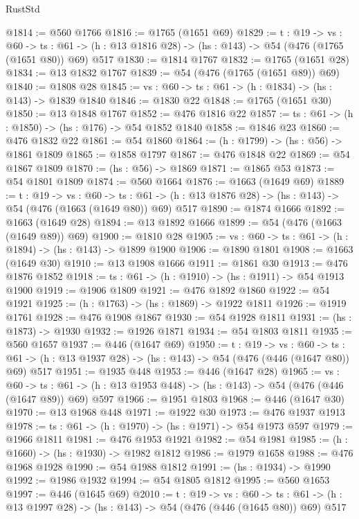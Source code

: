 \begin{lexlean}{RustStd}
\begin{coremodule}
@1814 := @560 @1766
@1816 := @1765 (@1651 @69)
@1829 := {t : @19} ->
  {vs : @60} ->
  {ts : @61} -> (h : @13 @1816 @28) -> (hs : @143) -> @54 (@476 (@1765 (@1651 @80)) @69) @517
@1830 := @1814 @1767
@1832 := @1765 (@1651 @28)
@1834 := @13 @1832 @1767
@1839 := @54 (@476 (@1765 (@1651 @89)) @69)
@1840 := @1808 @28
@1845 := {vs : @60} -> {ts : @61} -> (h : @1834) -> (hs : @143) -> @1839 @1840
@1846 := @1830 @22
@1848 := @1765 (@1651 @30)
@1850 := @13 @1848 @1767
@1852 := @476 @1816 @22
@1857 := {ts : @61} -> (h : @1850) -> (hs : @176) -> @54 @1852 @1840
@1858 := @1846 @23
@1860 := @476 @1832 @22
@1861 := @54 @1860
@1864 := (h : @1799) -> (hs : @56) -> @1861 @1809
@1865 := @1858 @1797
@1867 := @476 @1848 @22
@1869 := @54 @1867 @1809
@1870 := (hs : @56) -> @1869
@1871 := @1865 @53
@1873 := @54 @1801 @1809
@1874 := @560 @1664
@1876 := @1663 (@1649 @69)
@1889 := {t : @19} ->
  {vs : @60} ->
  {ts : @61} -> (h : @13 @1876 @28) -> (hs : @143) -> @54 (@476 (@1663 (@1649 @80)) @69) @517
@1890 := @1874 @1666
@1892 := @1663 (@1649 @28)
@1894 := @13 @1892 @1666
@1899 := @54 (@476 (@1663 (@1649 @89)) @69)
@1900 := @1810 @28
@1905 := {vs : @60} -> {ts : @61} -> (h : @1894) -> (hs : @143) -> @1899 @1900
@1906 := @1890 @1801
@1908 := @1663 (@1649 @30)
@1910 := @13 @1908 @1666
@1911 := @1861 @30
@1913 := @476 @1876 @1852
@1918 := {ts : @61} -> (h : @1910) -> (hs : @1911) -> @54 @1913 @1900
@1919 := @1906 @1809
@1921 := @476 @1892 @1860
@1922 := @54 @1921
@1925 := (h : @1763) -> (hs : @1869) -> @1922 @1811
@1926 := @1919 @1761
@1928 := @476 @1908 @1867
@1930 := @54 @1928 @1811
@1931 := (hs : @1873) -> @1930
@1932 := @1926 @1871
@1934 := @54 @1803 @1811
@1935 := @560 @1657
@1937 := @446 (@1647 @69)
@1950 := {t : @19} ->
  {vs : @60} ->
  {ts : @61} -> (h : @13 @1937 @28) -> (hs : @143) -> @54 (@476 (@446 (@1647 @80)) @69) @517
@1951 := @1935 @448
@1953 := @446 (@1647 @28)
@1965 := {vs : @60} ->
  {ts : @61} -> (h : @13 @1953 @448) -> (hs : @143) -> @54 (@476 (@446 (@1647 @89)) @69) @597
@1966 := @1951 @1803
@1968 := @446 (@1647 @30)
@1970 := @13 @1968 @448
@1971 := @1922 @30
@1973 := @476 @1937 @1913
@1978 := {ts : @61} -> (h : @1970) -> (hs : @1971) -> @54 @1973 @597
@1979 := @1966 @1811
@1981 := @476 @1953 @1921
@1982 := @54 @1981
@1985 := (h : @1660) -> (hs : @1930) -> @1982 @1812
@1986 := @1979 @1658
@1988 := @476 @1968 @1928
@1990 := @54 @1988 @1812
@1991 := (hs : @1934) -> @1990
@1992 := @1986 @1932
@1994 := @54 @1805 @1812
@1995 := @560 @1653
@1997 := @446 (@1645 @69)
@2010 := {t : @19} ->
  {vs : @60} ->
  {ts : @61} -> (h : @13 @1997 @28) -> (hs : @143) -> @54 (@476 (@446 (@1645 @80)) @69) @517

\end{coremodule}
\end{lexlean}
